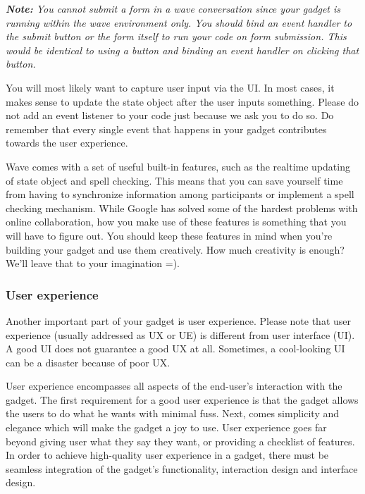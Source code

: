{\em \textbf{Note:} You cannot submit a form in a wave conversation
since your gadget is running within the wave environment only. You
should bind an event handler to the submit button or the form itself
to run your code on form submission. This would be identical to using a
button and binding an event handler on clicking that button.}

You will most likely want to capture user input via the UI. In
most cases, it makes sense to update the state object after the user
inputs something.  Please do not add an event listener to your
code just because we ask you to do so.  Do remember that every single
event that happens in your gadget contributes towards the user experience.


Wave comes with a set of useful built-in features, such as the
realtime updating of state object and spell checking. This means that
you can save yourself time from having to synchronize information
among participants or implement a spell checking mechanism. While
Google has solved some of the hardest problems with online
collaboration, how you make use of these features is something that
you will have to figure out. You should keep these features in mind
when you're building your gadget and use them creatively. How much
creativity is enough?  We'll leave that to your imagination =).


\subsubsection{User experience}

Another important part of your gadget is user experience. Please note
that user experience (usually addressed as UX or UE) is different from
user interface (UI). A good UI does not guarantee a good UX at
all. Sometimes, a cool-looking UI can be a disaster because of poor
UX.

User experience encompasses all aspects of the end-user's interaction
with the gadget. The first requirement for a good user experience is
that the gadget allows the users to do what he wants with minimal
fuss. Next, comes simplicity and elegance which will make the gadget a
joy to use.  User experience goes far beyond giving user what they say
they want, or providing a checklist of features. In order to achieve
high-quality user experience in a gadget, there must be seamless
integration of the gadget's functionality, interaction design and
interface design.

